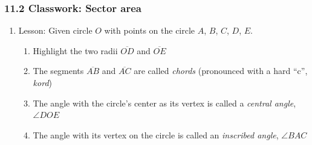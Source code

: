 

\fancyhead[LE]{\thepage}



\subsubsection*{11.2 Classwork: Sector area}
\begin{enumerate}
\item Lesson: Given circle $O$ with points on the circle $A$, $B$, $C$, $D$, $E$.
    \begin{multicols}{2}
    \raggedcolumns
    \begin{enumerate}[itemsep=0.5cm]
      \item Highlight the two radii $\overline{OD}$ and $\overline{OE}$
      \item The segments $\overline{AB}$ and $\overline{AC}$ are called \emph{chords} (pronounced with a hard ``c'', \emph{kord})
      \item The angle with the circle's center as its vertex is called a \emph{central angle}, $\angle DOE$
      \item The angle with its vertex on the circle is called an \emph{inscribed angle}, $\angle BAC$
      
    \end{enumerate}
    \end{multicols}


\end{enumerate}

